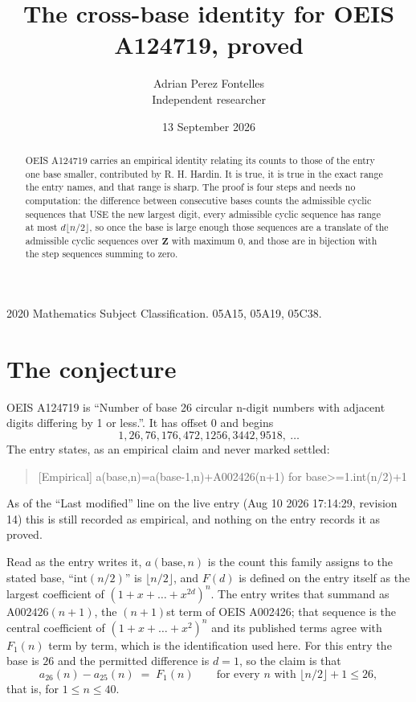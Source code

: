 \documentclass[11pt,a4paper]{article}
\title{The cross-base identity for OEIS A124719, proved}
\author{Adrian Perez Fontelles\\ \small Independent researcher}
\date{13 September 2026}
\theoremstyle{plain}
\theoremstyle{definition}
\begin{document}
\maketitle

\begin{abstract}
OEIS A124719 carries an empirical identity relating its counts to those of the entry one base
smaller, contributed by R. H. Hardin. It is true, it is true in the exact range the entry
names, and that range is sharp. The proof is four steps and needs no computation: the
difference between consecutive bases counts the admissible cyclic sequences that USE the new
largest digit, every admissible cyclic sequence has range at most $d\lfloor n/2\rfloor$, so
once the base is large enough those sequences are a translate of the admissible cyclic
sequences over $\mathbf{Z}$ with maximum $0$, and those are in bijection with the step
sequences summing to zero.
\end{abstract}

\noindent\small 2020 Mathematics Subject Classification. 05A15, 05A19, 05C38.\normalsize

\section{The conjecture}

OEIS A124719 is ``Number of base 26 circular n-digit numbers with adjacent digits differing by 1 or less.''. It has offset $0$ and begins
\[
1, 26, 76, 176, 472, 1256, 3442, 9518,\ \dots
\]
The entry states, as an empirical claim and never marked settled:
\begin{quote}
[Empirical] a(base,n)=a(base-1,n)+A002426(n+1) for base>=1.int(n/2)+1
\end{quote}
As of the ``Last modified'' line on the live entry (Aug 10 2026 17:14:29, revision 14)
this is still recorded as empirical, and nothing on the entry records it as proved.

Read as the entry writes it, $a(\mathrm{base},n)$ is the count this family assigns to the
stated base, ``$\mathrm{int}(n/2)$'' is $\lfloor n/2\rfloor$, and $F(d)$ is defined on the
entry itself as the largest coefficient of $(1+x+\dots+x^{2d})^{n}$. The entry writes that summand as $\mathrm{A002426}(n+1)$, the $(n+1)$st term of OEIS A002426; that sequence is the central coefficient of $(1+x+\dots+x^{2})^{n}$ and its published terms agree with $F_{1}(n)$ term by term, which is the identification used here. For this entry
the base is $26$ and the permitted difference is $d=1$, so the claim is that
\[
a_{26}(n)-a_{25}(n)\;=\;F_{1}(n)
\qquad\text{for every } n \text{ with } \lfloor n/2\rfloor+1\le26,
\]
that is, for $1\le n\le40$.
\end{document}
